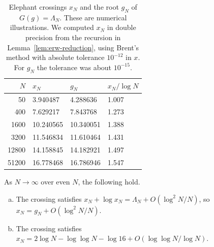 \begin{table}[t]
\centering\small
\caption{Elephant crossings $x_N$ and the root $g_N$ of $G(g)=\Lambda_N$.
These are numerical illustrations. We computed $x_N$ in double
precision from the recursion in Lemma~\ref{lem:erw-reduction}, using
Brent's method with absolute tolerance $10^{-12}$ in $x$.
For $g_N$ the tolerance was about $10^{-15}$.}
\label{tab:erw-crossing}
\begin{tabular}{@{}rlll@{}}
\toprule
$N$ & $x_N$ & $g_N$ & $x_N/\log N$\\
\midrule
50 & 3.940487 & 4.288636 & 1.007\\
400 & 7.629217 & 7.843768 & 1.273\\
1600 & 10.240565 & 10.340051 & 1.388\\
3200 & 11.546834 & 11.610464 & 1.431\\
12800 & 14.158845 & 14.182921 & 1.497\\
51200 & 16.778468 & 16.786946 & 1.547\\
\bottomrule
\end{tabular}
\end{table}

\begin{theorem}\label{thm:erw-crossing}
As $N\to\infty$ over even $N$, the following hold.
\begin{enumerate}[(a)]
\item The crossing satisfies $x_N+\log x_N=\Lambda_N+O(\log^2N/N)$, so
$x_N=g_N+O(\log^2N/N)$.
\item The crossing satisfies
$x_N=2\log N-\log\log N-\log16+O(\log\log N/\log N)$.
\end{enumerate}
\end{theorem}

